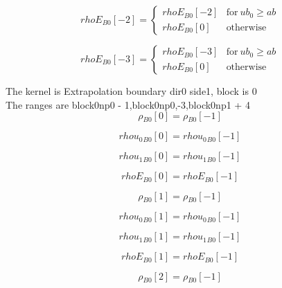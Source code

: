 \documentclass{article}
\begin{document}
\begin{dmath}{rhoE{_{B0}}}[{-2}] = \begin{cases} {rhoE{_{B0}}}[{-2}] & \text{for}\: ub_{0} \geq ab \\{rhoE{_{B0}}}[{0}] & \text{otherwise} \end{cases}\end{dmath}

\begin{dmath}{rhoE{_{B0}}}[{-3}] = \begin{cases} {rhoE{_{B0}}}[{-3}] & \text{for}\: ub_{0} \geq ab \\{rhoE{_{B0}}}[{0}] & \text{otherwise} \end{cases}\end{dmath}

\noindent The kernel is Extrapolation boundary dir0 side1, block is 0\\\noindent The ranges are block0np0 - 1,block0np0,-3,block0np1 + 4\\\begin{dmath}{\rho{_{B0}}}[{0}] = {\rho{_{B0}}}[{-1}]\end{dmath}

\begin{dmath}{rhou_{0}{_{B0}}}[{0}] = {rhou_{0}{_{B0}}}[{-1}]\end{dmath}

\begin{dmath}{rhou_{1}{_{B0}}}[{0}] = {rhou_{1}{_{B0}}}[{-1}]\end{dmath}

\begin{dmath}{rhoE{_{B0}}}[{0}] = {rhoE{_{B0}}}[{-1}]\end{dmath}

\begin{dmath}{\rho{_{B0}}}[{1}] = {\rho{_{B0}}}[{-1}]\end{dmath}

\begin{dmath}{rhou_{0}{_{B0}}}[{1}] = {rhou_{0}{_{B0}}}[{-1}]\end{dmath}

\begin{dmath}{rhou_{1}{_{B0}}}[{1}] = {rhou_{1}{_{B0}}}[{-1}]\end{dmath}

\begin{dmath}{rhoE{_{B0}}}[{1}] = {rhoE{_{B0}}}[{-1}]\end{dmath}

\begin{dmath}{\rho{_{B0}}}[{2}] = {\rho{_{B0}}}[{-1}]\end{dmath}
\end{document}
